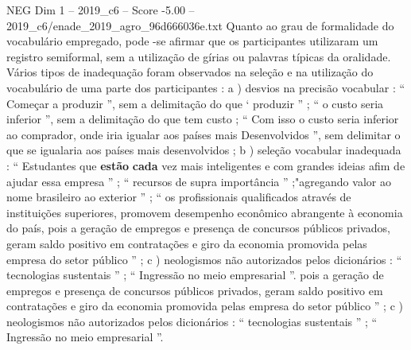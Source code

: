 \begin{textsample}{NEG Dim 1 – 2019\_c6 – Score -5.00 – 2019\_c6/enade\_2019\_agro\_96d666036e.txt}
Quanto ao grau de formalidade do vocabulário empregado, pode -se afirmar que os participantes utilizaram um registro semiformal, sem a utilização de gírias ou palavras típicas da oralidade.
Vários tipos de inadequação foram observados na seleção e na utilização do vocabulário de uma parte dos participantes : a ) desvios na precisão vocabular : “ Começar a produzir ”, sem a delimitação do que ‘ produzir ” ; “ o custo seria inferior ”, sem a delimitação do que tem custo ; “ Com isso o custo seria inferior ao comprador, onde iria igualar aos países mais Desenvolvidos ”, sem delimitar o que se igualaria aos países mais desenvolvidos ; b ) seleção vocabular inadequada : “ Estudantes que \textbf{estão} \textbf{cada} vez mais inteligentes e com grandes ideias afim de ajudar essa empresa ” ; “ recursos de supra importância ” ;"agregando valor ao nome brasileiro ao exterior ” ; “ os profissionais qualificados através de instituições superiores, promovem desempenho econômico abrangente à economia do país, pois a geração de empregos e presença de concursos públicos privados, geram saldo positivo em contratações e giro da economia promovida pelas empresa do setor público ” ; c ) neologismos não autorizados pelos dicionários : “ tecnologias sustentais ” ; “ Ingressão no meio empresarial ”. pois a geração de empregos e presença de concursos públicos privados, geram saldo positivo em contratações e giro da economia promovida pelas empresa do setor público ” ; c ) neologismos não autorizados pelos dicionários : “ tecnologias sustentais ” ; “ Ingressão no meio empresarial ”.

\end{textsample}
